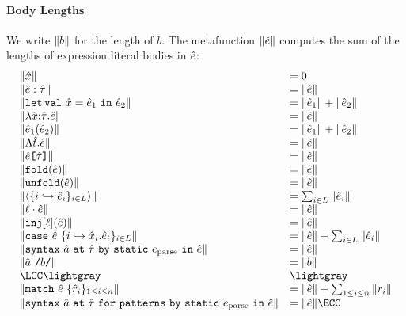 \paragraph{Body Lengths}\label{appendix:SES-body-lengths}
We write $\Vert b \Vert$ for the length of $b$. The metafunction $\Vert {\hat e} \Vert$ computes the sum of the lengths of expression literal bodies in ${\hat e}$:
\[
\begin{array}{ll}
\sizeof{\ux} & = 0\\
\sizeof{\asc{\ue}{\utau}} & = \sizeof{\ue}\\
\sizeof{\letsyn{\ux}{\ue_1}{\ue_2}} & = \sizeof{\ue_1} + \sizeof{\ue_2}\\
\sizeof{\lam{\ux}{\utau}{\ue}} &= \sizeof{\ue}\\
\sizeof{\ap{\ue_1}{\ue_2}} & = \sizeof{\ue_1} + \sizeof{\ue_2}\\
\sizeof{\Lam{\ut}{\ue}} & = \sizeof{\ue}\\
\sizeof{\App{\ue}{\utau}} & = \sizeof{\ue}\\
\sizeof{\fold{\ue}} & = \sizeof{\ue}\\
\sizeof{\unfold{\ue}} & = \sizeof{\ue}\\
\sizeof{\tpl{\mapschema{\ue}{i}{\labelset}}} & = \sum_{i \in \labelset} \sizeof{\ue_i}\\
\sizeof{\prj{\ell}{\ue}} & = \sizeof{\ue}\\
\sizeof{\inj{\ell}{\ue}} & = \sizeof{\ue}\\
\sizeof{\caseof{\ue}{\mapschemab{\ux}{\ue}{i}{\labelset}}} & = \sizeof{\ue} + \sum_{i \in \labelset} \sizeof{\ue_i}\\
\sizeof{\uesyntax{\tsmv}{\utau}{\eparse}{\ue}} & = \sizeof{\ue}\\
\sizeof{\utsmap{\tsmv}{b}} & = \sizeof{b}\\
\LCC \lightgray & \lightgray\\
\sizeof{\matchwith{\ue}{\seqschemaX{\urv}}} & = \sizeof{\ue} + \sum_{1 \leq i \leq n} \sizeof{r_i}\\
\sizeof{\usyntaxup{\tsmv}{\utau}{\eparse}{\ue}} & = \sizeof{\ue}\ECC
\end{array}
\]
